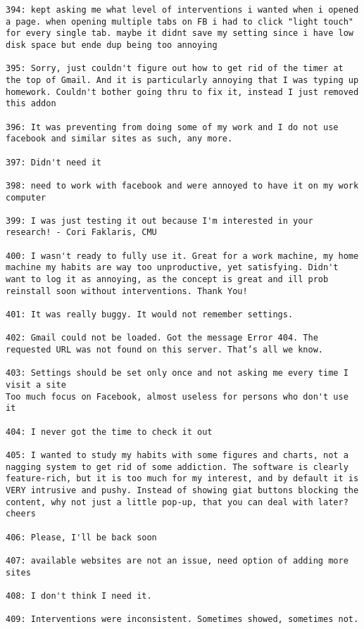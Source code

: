 \begin{lstlisting}[breaklines]
394: kept asking me what level of interventions i wanted when i opened a page. when opening multiple tabs on FB i had to click "light touch" for every single tab. maybe it didnt save my setting since i have low disk space but ende dup being too annoying

395: Sorry, just couldn't figure out how to get rid of the timer at the top of Gmail. And it is particularly annoying that I was typing up homework. Couldn't bother going thru to fix it, instead I just removed this addon

396: It was preventing from doing some of my work and I do not use facebook and similar sites as such, any more.

397: Didn't need it

398: need to work with facebook and were annoyed to have it on my work computer

399: I was just testing it out because I'm interested in your research! - Cori Faklaris, CMU

400: I wasn't ready to fully use it. Great for a work machine, my home machine my habits are way too unproductive, yet satisfying. Didn't want to log it as annoying, as the concept is great and ill prob reinstall soon without interventions. Thank You!

401: It was really buggy. It would not remember settings.

402: Gmail could not be loaded. Got the message Error 404. The requested URL was not found on this server. That’s all we know.

403: Settings should be set only once and not asking me every time I visit a site
Too much focus on Facebook, almost useless for persons who don't use it

404: I never got the time to check it out

405: I wanted to study my habits with some figures and charts, not a nagging system to get rid of some addiction. The software is clearly feature-rich, but it is too much for my interest, and by default it is VERY intrusive and pushy. Instead of showing giat buttons blocking the content, why not just a little pop-up, that you can deal with later? cheers

406: Please, I'll be back soon

407: available websites are not an issue, need option of adding more sites

408: I don't think I need it.

409: Interventions were inconsistent. Sometimes showed, sometimes not.


\end{lstlisting}
